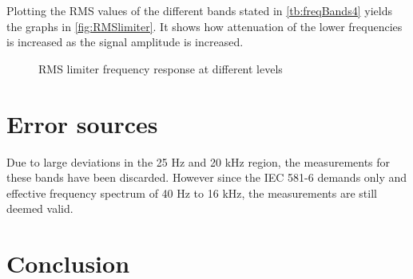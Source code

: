 Plotting the RMS values of the different bands stated in \autoref{tb:freqBands4} yields the graphs in \autoref{fig:RMSlimiter}. It shows how attenuation of the lower frequencies is increased as the signal amplitude is increased.

\begin{figure}[H]
	\centering
	
	\caption{RMS limiter frequency response at different levels}
	\label{fig:RMSlimiter}
\end{figure}


\section{Error sources}

Due to large deviations in the 25 Hz and 20 kHz region, the measurements for these bands have been discarded. However since the IEC 581-6 demands only and effective frequency spectrum of 40 Hz to 16 kHz, the measurements are still deemed valid.

\section{Conclusion}

